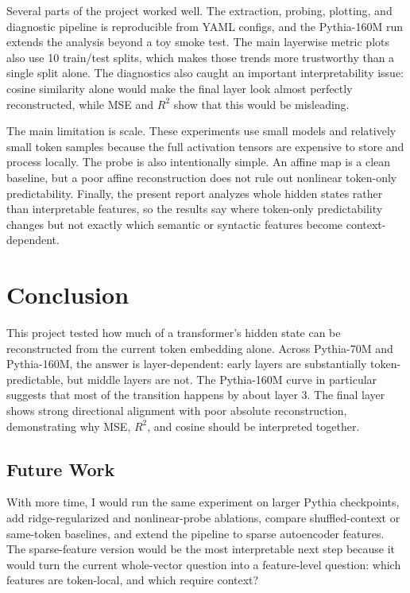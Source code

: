 \documentclass[10pt]{article}
\begin{document}
Several parts of the project worked well. The extraction, probing, plotting, and diagnostic pipeline is reproducible from YAML configs, and the Pythia-160M run extends the analysis beyond a toy smoke test. The main layerwise metric plots also use 10 train/test splits, which makes those trends more trustworthy than a single split alone. The diagnostics also caught an important interpretability issue: cosine similarity alone would make the final layer look almost perfectly reconstructed, while MSE and $R^2$ show that this would be misleading.

The main limitation is scale. These experiments use small models and relatively small token samples because the full activation tensors are expensive to store and process locally. The probe is also intentionally simple. An affine map is a clean baseline, but a poor affine reconstruction does not rule out nonlinear token-only predictability. Finally, the present report analyzes whole hidden states rather than interpretable features, so the results say where token-only predictability changes but not exactly which semantic or syntactic features become context-dependent.

\section{Conclusion}

This project tested how much of a transformer's hidden state can be reconstructed from the current token embedding alone. Across Pythia-70M and Pythia-160M, the answer is layer-dependent: early layers are substantially token-predictable, but middle layers are not. The Pythia-160M curve in particular suggests that most of the transition happens by about layer 3. The final layer shows strong directional alignment with poor absolute reconstruction, demonstrating why MSE, $R^2$, and cosine should be interpreted together.

\subsection{Future Work}

With more time, I would run the same experiment on larger Pythia checkpoints, add ridge-regularized and nonlinear-probe ablations, compare shuffled-context or same-token baselines, and extend the pipeline to sparse autoencoder features. The sparse-feature version would be the most interpretable next step because it would turn the current whole-vector question into a feature-level question: which features are token-local, and which require context?
\end{document}
